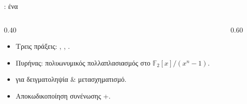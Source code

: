 \begin{frame}{\HQC: ένα }
  \begin{columns}[T]
    \begin{column}{0.40\textwidth}
      \begin{itemize}
        \item Τρεις πράξεις: \KeyGen, \Encaps, \Decaps.
        \item Πυρήνας: πολυωνυμικός πολλαπλασιασμός στο $\mathbb{F}_2[x]/(x^n-1)$.
        \item {} για δειγματοληψία \&  μετασχηματισμό.
        \item Αποκωδικοποίηση συνένωσης +.
      \end{itemize}
    \end{column}
    \begin{column}{0.60\textwidth}
      \resizebox{\linewidth}{!}{}
    \end{column}
  \end{columns}
\end{frame}
